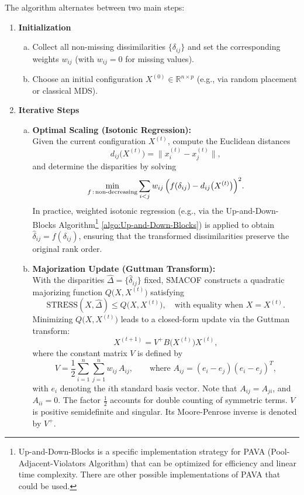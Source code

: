 The algorithm alternates between two main steps:

\begin{enumerate}
  \item \textbf{Initialization}
    \begin{enumerate}[(a)]
      \item Collect all non-missing dissimilarities $\{\delta_{ij}\}$ and set the corresponding weights $w_{ij}$ (with $w_{ij}=0$ for missing values).
      \item Choose an initial configuration $X^{(0)} \in \mathbb{R}^{n \times p}$ (e.g., via random placement or classical MDS).
    \end{enumerate}

  \item \textbf{Iterative Steps}
    \begin{enumerate}[(a)]
      \item \textbf{Optimal Scaling (Isotonic Regression):} \\
      Given the current configuration $X^{(t)}$, compute the Euclidean distances
      \[
        d_{ij}\bigl(X^{(t)}\bigr)=\|x_i^{(t)} - x_j^{(t)}\|,
      \]
      and determine the disparities by solving
      \[
        \min_{f\,:\, \text{non-decreasing}} \sum_{i<j} w_{ij}\,\Bigl(f(\delta_{ij}) - d_{ij}\bigl(X^{(t)}\bigr)\Bigr)^2.
      \]
      In practice, weighted isotonic regression (e.g., via the Up-and-Down-Blocks Algorithm\footnote{Up-and-Down-Blocks is a specific implementation strategy for PAVA (Pool-Adjacent-Violators Algorithm) that can be optimized for efficiency and linear time complexity. There are other possible implementations of PAVA that could be used.\cite{PAVA}} \ref{algo:Up-and-Down-Blocks}) is applied to obtain $\hat{\delta}_{ij}=f(\delta_{ij})$, ensuring that the transformed dissimilarities preserve the original rank order.
      
      \item \textbf{Majorization Update (Guttman Transform):} \\
      With the disparities $\hat{\Delta}=\{\hat{\delta}_{ij}\}$ fixed, 
      SMACOF constructs a quadratic majorizing function $Q\bigl(X, X^{(t)}\bigr)$ satisfying
      \[
        \mathrm{STRESS}(X,\hat{\Delta}) \le Q\bigl(X, X^{(t)}\bigr), \quad \text{with equality when } X = X^{(t)}.
      \]
      Minimizing $Q\bigl(X, X^{(t)}\bigr)$ leads to a closed-form update via the Guttman transform:
      \[
        X^{(t+1)} = V^{+}B\bigl(X^{(t)}\bigr)X^{(t)},
      \]
      \hspace{1em}where the constant matrix \(V\) is defined by
          \[
            V = \frac{1}{2}\sum_{i=1}^n \sum_{j=1}^n w_{ij}\,A_{ij}, \qquad \text{where }A_{ij} = (e_i - e_j)(e_i - e_j)^T,
          \]
          \hspace{1em}with \(e_i\) denoting the \(i\)th standard basis vector. Note that \(A_{ij} = A_{ji}\), and \(A_{ii} = 0\). The factor \(\frac{1}{2}\) accounts for double counting of symmetric terms. \(V\) is positive semidefinite and singular. Its Moore-Penrose inverse is denoted by \(V^{+}\).\\


\end{enumerate}
\end{enumerate}
